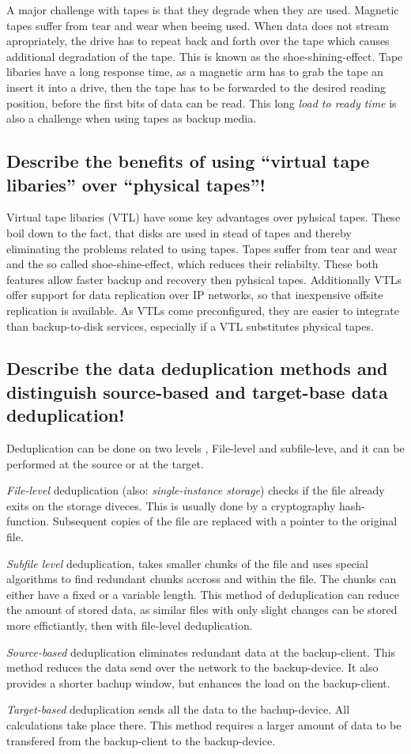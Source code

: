 \documentclass{article}
\begin{document}
	A major challenge with tapes is that they degrade when they are used.
	Magnetic tapes suffer from tear and wear when beeing used.
	When data does not stream apropriately,
	the drive has to repeat back and forth over the tape
	which causes additional degradation of the tape.
	This is known as the shoe-shining-effect.
	Tape libaries have a long response time,
	as a magnetic arm has to grab the tape an insert it into a drive,
	then the tape has to be forwarded to the desired reading position,
	before the first bits of data can be read.
	This long \textsl{load to ready time} is also a challenge when using tapes as backup media.

\subsection{Describe the benefits of using ``virtual tape libaries'' over ``physical tapes''!}
	Virtual tape libaries (VTL) have some key advantages over pyhsical tapes.
	These boil down to the fact,
	that disks are used in stead of tapes
	and thereby eliminating the problems related to using tapes.
	Tapes suffer from tear and wear and the so called shoe-shine-effect,
	which reduces their reliabilty.
	These both features allow faster backup and recovery
	then pyhsical tapes.
	Additionally VTLs offer support for data replication over IP networks,
	so that inexpensive offsite replication is available.
	As VTLs come preconfigured,
	they are easier to integrate than backup-to-disk services,
	especially if a VTL substitutes physical tapes.

\subsection{Describe the data deduplication methods and distinguish source-based and target-base data deduplication!}
	Deduplication can be done on two levels , File-level and subfile-leve,
	and it can be performed at the source or at the target.

	\emph{File-level} deduplication (also: \textsl{single-instance storage}) 
	checks if the file already exits on the storage diveces.
	This is usually done by a cryptography hash-function.
	Subsequent copies of the file are replaced with a pointer to the original file.

	\emph{Subfile level} deduplication,
	takes smaller chunks of the file
	and uses special algorithms to find redundant chunks accross and within the file.
	The chunks can either have a fixed or a variable length.
	This method of deduplication can reduce the amount of stored data,
	as similar files with only slight changes can be stored more effictiantly,
	then with file-level deduplication.

	\emph{Source-based} deduplication eliminates redundant data at the backup-client.
	This method reduces the data send over the network to the backup-device.
	It also provides a shorter bachup window,
	but enhances the load on the backup-client.

	\emph{Target-based} deduplication sends all the data to the bachup-device.
	All calculations take place there.
	This method requires a larger amount of data to be transfered from
	the backup-client to the backup-device.
\end{document}
